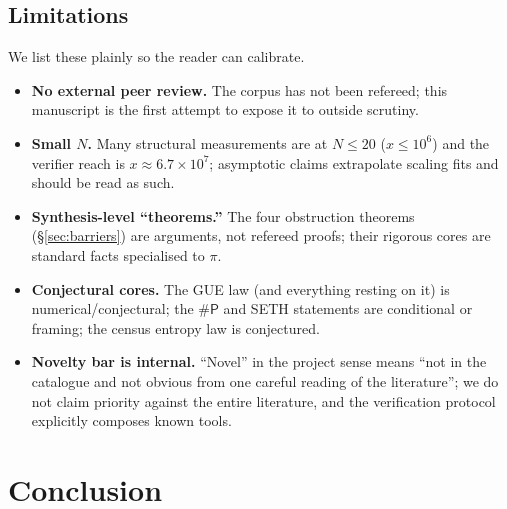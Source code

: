 \documentclass[11pt]{article}
\theoremstyle{plain}
\theoremstyle{definition}
\theoremstyle{remark}
\newcommand{\sharpP}{\#\mathsf{P}}
\begin{document}
\subsection{Limitations}

We list these plainly so the reader can calibrate.
\begin{itemize}[leftmargin=1.4em,itemsep=2pt]
\item \textbf{No external peer review.} The corpus has not been refereed; this
manuscript is the first attempt to expose it to outside scrutiny.
\item \textbf{Small $N$.} Many structural measurements are at $N\le 20$
($x\le10^6$) and the verifier reach is $x\approx6.7\times10^7$; asymptotic claims
extrapolate scaling fits and should be read as such.
\item \textbf{Synthesis-level ``theorems.''} The four obstruction theorems
(\S\ref{sec:barriers}) are arguments, not refereed proofs; their rigorous cores
are standard facts specialised to $\pi$.
\item \textbf{Conjectural cores.} The GUE law (and everything resting on it) is
numerical/conjectural; the $\sharpP$ and SETH statements are conditional or
framing; the census entropy law is conjectured.
\item \textbf{Novelty bar is internal.} ``Novel'' in the project sense means
``not in the catalogue and not obvious from one careful reading of the
literature''; we do not claim priority against the entire literature, and the
verification protocol explicitly composes known tools.
\end{itemize}

\section{Conclusion}
\label{sec:conclusion}
\end{document}
